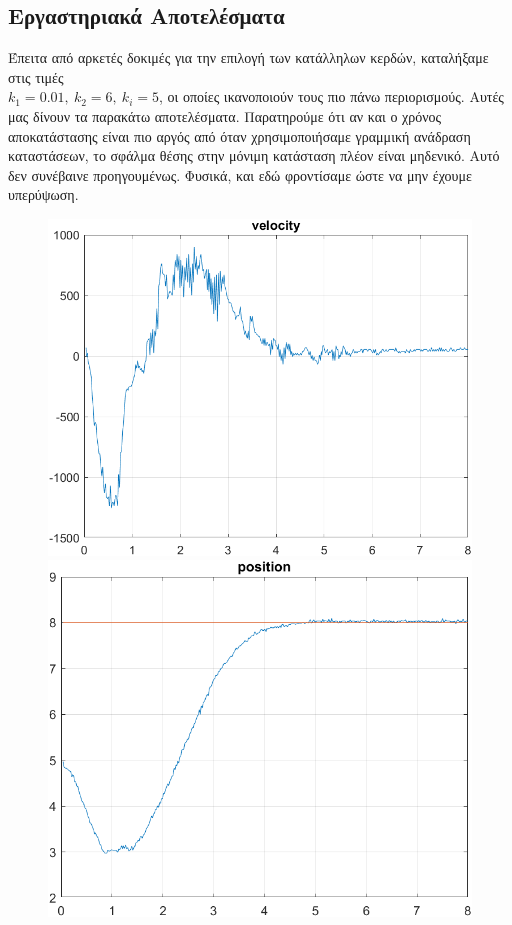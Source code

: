 \subsection{Εργαστηριακά Αποτελέσματα}
Έπειτα από αρκετές δοκιμές για την επιλογή των κατάλληλων κερδών, καταλήξαμε στις τιμές \\$k_1 = 0.01,\ k_2 = 6,\ k_i = 5$, οι οποίες ικανοποιούν τους πιο πάνω περιορισμούς. Αυτές μας δίνουν τα παρακάτω αποτελέσματα. Παρατηρούμε ότι αν και ο χρόνος αποκατάστασης είναι πιο αργός από όταν χρησιμοποιήσαμε γραμμική ανάδραση καταστάσεων, το σφάλμα θέσης στην μόνιμη κατάσταση πλέον είναι μηδενικό. Αυτό δεν συνέβαινε προηγουμένως. Φυσικά, και εδώ φροντίσαμε ώστε να μην έχουμε υπερύψωση.
\begin{figure}[H]
    \centering
    \begin{minipage}{0.45\textwidth}
        \includegraphics[width=\linewidth]{Images/lab3/vel32.png}
    \end{minipage}
    \hfill
    \begin{minipage}{0.45\textwidth}
        \includegraphics[width=\linewidth]{Images/lab3/pos32.png}
    \end{minipage}
    \end{figure}
